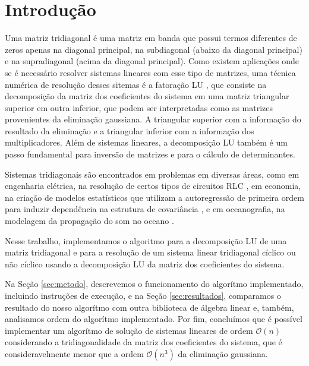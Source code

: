 \documentclass[a4,12pt]{horizon-theme}
\renewcommand{\thefootnote}{\fnsymbol{footnote}}
\begin{document}
\horizonCover

\horizonTitle

\renewcommand{\thefootnote}{\arabic{footnote}}
\hspace{40pt}




\section{Introdução}
Uma matriz tridiagonal é uma matriz em banda que possui termos diferentes de zeros apenas na diagonal principal, na subdiagonal (abaixo da diagonal principal) e na supradiagonal (acima da diagonal principal). Como existem aplicações onde se é necessário resolver sistemas lineares com esse tipo de matrizes, uma  técnica numérica de resolução desses sitemas é a fatoração LU \citep{bana1, bana2}, que consiste na decomposição da matriz dos coeficientes do sistema em uma matriz triangular superior em outra inferior, que podem ser interpretadas como as matrizes provenientes da eliminação gaussiana. A triangular superior com a informação do resultado da eliminação e a triangular inferior com a informação dos multiplicadores. Além de sistemas lineares, a decomposição LU também é um passo fundamental para inversão de matrizes e para o cálculo de determinantes.

Sistemas tridiagonais são encontrados em problemas em diversas áreas, como em engenharia elétrica, na resolução de certos tipos de circuitos RLC \citep{ex1}, em economia, na criação de modelos estatísticos que utilizam a autoregressão de primeira ordem para induzir dependência na estrutura de covariância \citep{ex2}, e em oceanografia, na modelagem da propagação do som no oceano \citep{ex3}.

Nesse trabalho, implementamos o algoritmo para a decomposição LU de uma matriz tridiagonal e para a resolução de um sistema linear tridiagonal cíclico ou não cíclico usando a decomposição LU da matriz dos coeficientes do sistema.

Na Seção \ref{sec:metodo}, descrevemos o funcionamento do algorítmo implementado, incluindo instruções de execução, e na Seção \ref{sec:resultados}, comparamos o resultado do nosso algorítmo com outra biblioteca de álgebra linear e, também, analisamos ordem do algorítmo implementado. Por fim, concluímos que é possível implementar um algorítmo de solução de sistemas lineares de ordem $\mathcal{O}(n)$ considerando a tridiagonalidade da matriz dos coeficientes do sistema, que é consideravelmente menor que a ordem $\mathcal{O}(n^3)$ da eliminação gaussiana.
\end{document}

